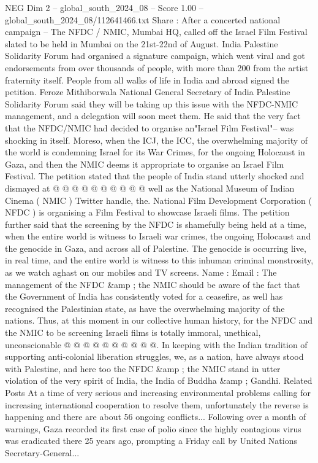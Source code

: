 \begin{textsample}{NEG Dim 2 – global\_south\_2024\_08 – Score 1.00 – global\_south\_2024\_08/112641466.txt}  \label{ex:f2_neg_117}
Share : After a concerted national campaign -- The NFDC / NMIC, Mumbai HQ, called off the Israel Film Festival slated to be held in Mumbai on the 21st-22nd of August.
India Palestine Solidarity Forum had organised a signature campaign, which went viral and got endorsements from over thousands of people, with more than 200 from the artist fraternity itself.
People from all walks of life in India and abroad signed the petition.
Feroze Mithiborwala National General Secretary of India Palestine Solidarity Forum said they will be taking up this issue with the NFDC-NMIC management, and a delegation will soon meet them.
He said that the very fact that the NFDC/NMIC had decided to organise an"Israel Film Festival"-- was shocking in itself.
Moreso, when the ICJ, the ICC, the overwhelming majority of the world is condemning Israel for its War Crimes, for the ongoing Holocaust in Gaza, and then the NMIC deems it appropriate to organise an Israel Film Festival.
The petition stated that the people of India stand utterly shocked and dismayed at @ @ @ @ @ @ @ @ @ @ well as the National Museum of Indian Cinema ( NMIC ) Twitter handle, the.
National Film Development Corporation ( NFDC ) is organising a Film Festival to showcase Israeli films.
The petition further said that the screening by the NFDC is shamefully being held at a time, when the entire world is witness to Israeli war crimes, the ongoing Holocaust and the genocide in Gaza, and across all of Palestine.
The genocide is occurring live, in real time, and the entire world is witness to this inhuman criminal monstrosity, as we watch aghast on our mobiles and TV screens.
Name : Email : The management of the NFDC \&amp ; the NMIC should be aware of the fact that the Government of India has consistently voted for a ceasefire, as well has recognised the Palestinian state, as have the overwhelming majority of the nations.
Thus, at this moment in our collective human history, for the NFDC and the NMIC to be screening Israeli films is totally immoral, unethical, unconscionable @ @ @ @ @ @ @ @ @ @.
In keeping with the Indian tradition of supporting anti-colonial liberation struggles, we, as a nation, have always stood with Palestine, and here too the NFDC \&amp ; the NMIC stand in utter violation of the very spirit of India, the India of Buddha \&amp ; Gandhi.
Related Posts At a time of very serious and increasing environmental problems calling for increasing international cooperation to resolve them, unfortunately the reverse is happening and there are about 56 ongoing conflicts...
Following over a month of warnings, Gaza recorded its first case of polio since the highly contagious virus was eradicated there 25 years ago, prompting a Friday call by United Nations Secretary-General...

\end{textsample}
